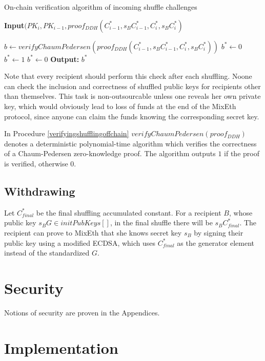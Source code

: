 \documentclass[a4paper,UKenglish,cleveref, autoref]{oasics-v2019}
\begin{document}
\begin{algorithm}
	\caption{On-chain verification algorithm of incoming shuffle challenges}\label{verifyingshufflingoffchain}
	\hspace*{\algorithmicindent} \textbf{Input}$(PK_{i}, PK_{i-1}, proof_{DDH}(C^{*}_{i-1},s_{B}C^{*}_{i-1},C^{*}_{i},s_{B}C^{*}_{i})$ \\
	\begin{algorithmic}[1]
		\State $b\leftarrow verifyChaumPedersen(proof_{DDH}(C^{*}_{i-1},s_{B}C^{*}_{i-1}, C^{*}_{i},s_{B}C^{*}_{i}))$ 
		\State $b^*\leftarrow0$
		\State $b^*\gets 1$
		\Else
		\State $b^*\gets 0$
		\EndIf
		\hspace*{\algorithmicindent} \textbf{Output:} $b^{*}$ 
	\end{algorithmic}   
\end{algorithm}
Note that every recipient should perform this check after each shuffling. Noone can check the inclusion and correctness of shuffled public keys for recipients other than themselves. This task is non-outsourcable unless one reveals her own private key, which would obviously lead to loss of funds at the end of the MixEth protocol, since anyone can claim the funds knowing the corresponding secret key.

In Procedure \ref{verifyingshufflingoffchain} $verifyChaumPedersen(proof_{DDH})$ denotes a deterministic polynomial-time algorithm which verifies the correctness of a Chaum-Pedersen zero-knowledge proof. The algorithm outputs $1$ if the proof is verified, otherwise $0$.   

\subsection{Withdrawing}
Let $C^*_{final}$ be the final shuffling accumulated constant. For a recipient $B$, whose public key $s_{B}G \in initPubKeys[]$, in the final shuffle there will be $s_{B}C^*_{final}$. The recipient can prove to MixEth that she knows secret key $s_{B}$ by signing their public key using a modified ECDSA, which uses $C^*_{final}$ as the generator element instead of the standardized $G$.

\section{Security}
Notions of security are proven in the Appendices.

\section{Implementation}
\end{document}
